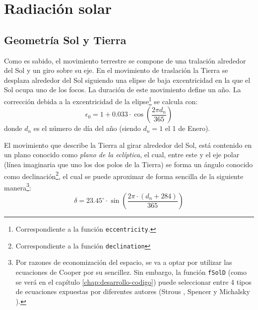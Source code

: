 \section{Radiación solar}
\label{sec:org3e05ede}
\label{radiacion-solar}
\subsection{Geometría Sol y Tierra}
\label{sec:org19ef36a}
Como es sabido, el movimiento terrestre se compone de una tralación alrededor del Sol y un giro sobre su eje. En el movimiento de traslación la Tierra se desplaza alrededor del Sol siguiendo una elipse de baja excentricidad en la que el Sol ocupa uno de los focos. La duración de este movimiento define un año. La corrección debida a la excentricidad de la elipse\footnote{Correspondiente a la función \texttt{eccentricity}.} se calcula con: 
\begin{equation}
\epsilon_0=1+0.033\cdot \cos(\frac{2\pi d_n}{365})
\end{equation}
donde \(d_n\) es el número de día del año (siendo \(d_n=1\) el 1 de Enero). 

El movimiento que describe la Tierra al girar alrededor del Sol, está contenido en un plano conocido como \emph{plano de la eclíptica}, el cual, entre este y el eje polar (línea imaginaria que uno los dos polos de la Tierra) se forma un ángulo conocido como declinación\footnote{Correspondiente a la función \texttt{declination}}, el cual se puede aproximar de forma sencilla de la siguiente manera\footnote{Por razones de economización del espacio, se va a optar por utilizar las ecuaciones de Cooper \cite{Cooper1969} por su sencillez. Sin embargo, la función \texttt{fSolD} (como se verá en el capítulo \ref{chap:desarrollo-codigo}) puede seleccionar entre 4 tipos de ecuaciones expuestas por diferentes autores (Strous \cite{Strous2011}, Spencer \cite{Spencer1971} y Michalsky \cite{Michalsky1988}).}: 
\begin{equation}
\delta=23.45^\circ \cdot \sin(\frac{2\pi \cdot (d_n+284)}{365})
\end{equation}

